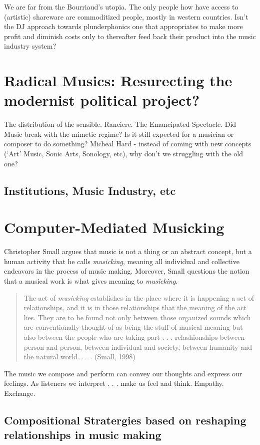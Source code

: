 We are far from the Bourriaud’s utopia. The only people how have access to (artistic) shareware are commoditized people, mostly in western countries. Isn’t the DJ approach towards plunderphonics one that appropriates to make more profit and diminish costs only to thereafter feed back their product into the music industry system?

 
\section{Radical Musics: Resurecting the modernist political project?}
The distribution of the sensible. Ranciere.
The Emancipated Spectacle.
Did Music break with the mimetic regime? Is it still expected for a musician or composer to do something? Micheal Hard - instead of coming with new concepts (`Art' Music, Sonic Arts, Sonology, etc), why don't we struggling with the old one?

\subsection{Institutions, Music Industry, etc} 

\section{Computer-Mediated Musicking}
Christopher Small argues that music is not a thing or an abstract concept, but a human activity that he calls \emph{musicking}, meaning all individual and collective endeavors in the process of music making. Moreover, Small questions the notion that a musical work is what gives meaning to \emph{musicking}. 

\begin{quote}
The act of \emph{musicking} establishes in the place where it is happening a set of relationships, and it is in those relationships that the meaning of the act lies. They are to be found not only between those organized sounds which are conventionally thought of as being the stuff of musical meaning but also between the people who are taking part . . . relashionships between person and person, between individual and society, between humanity and the natural world. . . . (Small, 1998)
\end{quote}

The music we compose and perform can convey our thoughts and express our feelings. As listeners we interpret . . . make us feel and think. Empathy. Exchange.  

\subsection{Compositional Stratergies based on reshaping relationships in music making}

